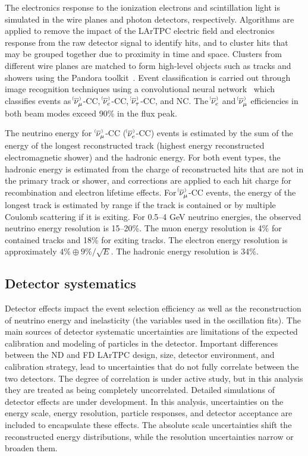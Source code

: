 The electronics response to the ionization electrons and scintillation light is simulated in the wire planes and photon detectors, respectively. Algorithms are applied to remove the impact of the LArTPC electric field and electronics response from the raw detector signal to identify hits, and to cluster hits that may be grouped together due to proximity in time and space. Clusters from different wire planes are matched to form high-level objects such as tracks and showers using the Pandora toolkit~\cite{Marshall:2015rfa,Acciarri:2017hat}. Event classification is carried out through image recognition techniques using a convolutional neural network~\cite{cvn_paper} which classifies events as $\nu^{\bracketbar}_{\mu}$-CC, $\nu^{\bracketbar}_{e}$-CC, $\nu^{\bracketbar}_{\tau}$-CC, and NC. The $\nue^{\bracketbar}$ and $\numu^{\bracketbar}$ efficiencies in both beam modes exceed 90\% in the flux peak.

The neutrino energy for $\,\nu^{\bracketbar}_{\mu}$-CC ($\,\nu^{\bracketbar}_{e}$-CC) events is estimated by the sum of the energy of the longest reconstructed track (highest energy reconstructed electromagnetic shower) and the hadronic energy. For both event types, the hadronic energy is estimated from the charge of reconstructed hits that are not in the primary track or shower, and corrections are applied to each hit charge for recombination and electron lifetime effects. For $\nu^{\bracketbar}_{\mu}$-CC events, the energy of the longest track is estimated by range if the track is contained or by multiple Coulomb scattering if it is exiting. For 0.5--4 GeV neutrino energies, the observed neutrino energy resolution is 15--20\%. The muon energy resolution is 4\% for contained tracks and 18\% for exiting tracks. The electron energy resolution is approximately $4\% \oplus 9\%/\sqrt{E}$. The hadronic energy resolution is 34\%.

\subsection{Detector systematics}
Detector effects impact the event selection efficiency as well as the reconstruction of neutrino energy and inelasticity (the variables used in the oscillation fits). The main sources of detector systematic uncertainties are limitations of the expected calibration and modeling of particles in the detector. Important differences between the ND and FD LArTPC design, size, detector environment, and calibration strategy, lead to uncertainties that do not fully correlate between the two detectors. The degree of correlation is under active study, but in this analysis they are treated as being completely uncorrelated. Detailed simulations of detector effects are under development. In this analysis, uncertainties on the energy scale, energy resolution, particle responses, and detector acceptance are included to encapsulate these effects. The absolute scale uncertainties shift the reconstructed energy distributions, while the resolution uncertainties narrow or broaden them.

